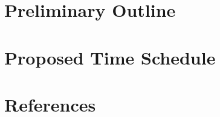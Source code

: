 \documentclass[english,notitlepage]{hgbreport}
\begin{document}
\section{Preliminary Outline}

\section{Proposed Time Schedule}



\section*{References}

\printbibliography[heading=noheader]

\end{document}
